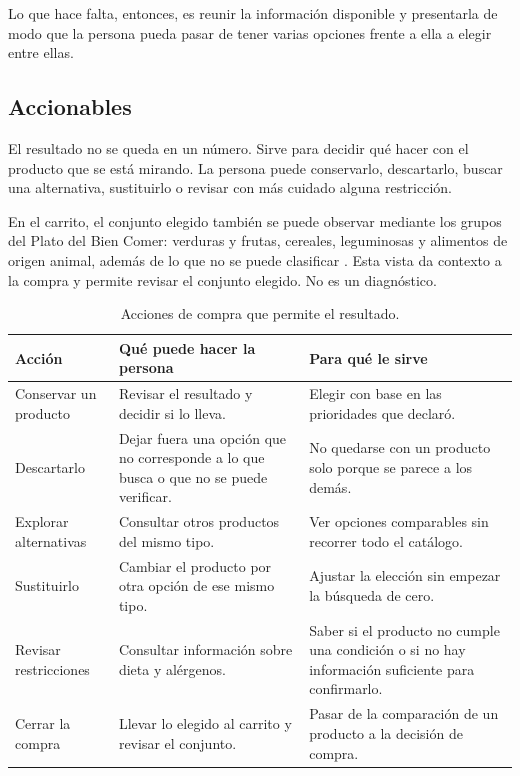 Lo que hace falta, entonces, es reunir la información disponible y presentarla de modo que la persona pueda pasar de tener varias opciones frente a ella a elegir entre ellas.

\subsection{Accionables}

El resultado no se queda en un número. Sirve para decidir qué hacer con el producto que se está mirando. La persona puede conservarlo, descartarlo, buscar una alternativa, sustituirlo o revisar con más cuidado alguna restricción.

En el carrito, el conjunto elegido también se puede observar mediante los grupos del Plato del Bien Comer: verduras y frutas, cereales, leguminosas y alimentos de origen animal, además de lo que no se puede clasificar \citep{nom0432013}. Esta vista da contexto a la compra y permite revisar el conjunto elegido. No es un diagnóstico.

\begin{table}[ht]
  \centering
  \caption{Acciones de compra que permite el resultado.}
  \label{tab:accionables}
  \small
  \begin{tabularx}{\textwidth}{>{\raggedright\arraybackslash}p{3.4cm}XX}
    \toprule
    Acción & Qué puede hacer la persona & Para qué le sirve \\
    \midrule
    Conservar un producto &
    Revisar el resultado y decidir si lo lleva. &
    Elegir con base en las prioridades que declaró. \\
    \addlinespace
    Descartarlo &
    Dejar fuera una opción que no corresponde a lo que busca o que no se puede verificar. &
    No quedarse con un producto solo porque se parece a los demás. \\
    \addlinespace
    Explorar alternativas &
    Consultar otros productos del mismo tipo. &
    Ver opciones comparables sin recorrer todo el catálogo. \\
    \addlinespace
    Sustituirlo &
    Cambiar el producto por otra opción de ese mismo tipo. &
    Ajustar la elección sin empezar la búsqueda de cero. \\
    \addlinespace
    Revisar restricciones &
    Consultar información sobre dieta y alérgenos. &
    Saber si el producto no cumple una condición o si no hay información suficiente para confirmarlo. \\
    \addlinespace
    Cerrar la compra &
    Llevar lo elegido al carrito y revisar el conjunto. &
    Pasar de la comparación de un producto a la decisión de compra. \\
    \bottomrule
  \end{tabularx}
\end{table}

